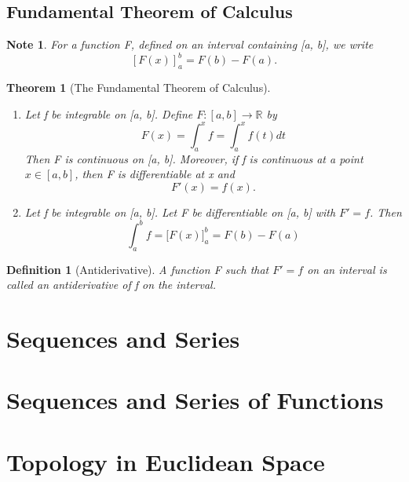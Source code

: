 \documentclass[11pt, oneside]{book}
\theoremstyle{break}
\newtheorem{thm}{Theorem}[section]
\newtheorem*{note}{Note}
\newtheorem{defn}{Definition}[section]
\newcommand{\bb}[1]{\mathbb{#1}}		%
\begin{document}
\section{Fundamental Theorem of Calculus}

\begin{note}
	For a function F, defined on an interval containing [a, b], we write
	\[
		[F(x)]_a^b = F(b) - F(a).
	\]
\end{note}

\begin{thm}[The Fundamental Theorem of Calculus]
	\begin{enumerate}
		\item Let f be integrable on [a, b]. Define $F: [a, b] \to \bb{R}$ by
			\[
				F(x) = \int_{a}^{x} f = \int_{a}^{x} f(t) dt
			\]
			Then F is continuous on [a, b]. Moreover, if f is continuous at a point $x \in [a, b]$, then F is differentiable at x and
			\[
				F'(x) = f(x).
			\]
		\item Let f be integrable on [a, b]. Let F be differentiable on [a, b] with $F' = f$. Then
			\[
				\int_{a}^{b} f = \lbrack F(x) \rbrack_a^b = F(b) - F(a)
			\]
	\end{enumerate}
\end{thm}

\begin{defn}[Antiderivative]
	A function F such that $F' = f$ on an interval is called an antiderivative of f on the interval.
\end{defn}


\chapter{Sequences and Series}

\chapter{Sequences and Series of Functions}

\chapter{Topology in Euclidean Space}


\appendix
\end{document}
